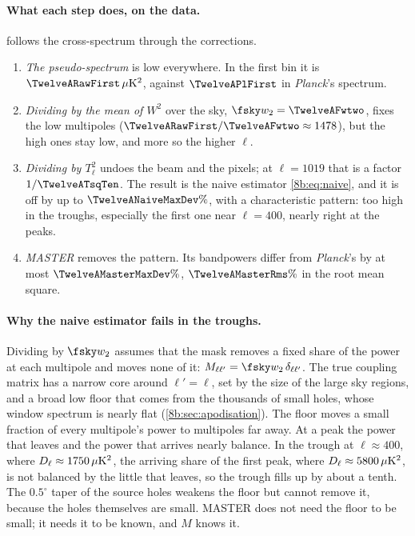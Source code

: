 \paragraph{What each step does, on the data.}  follows the cross-spectrum through the
corrections.
\begin{enumerate}[itemsep=2pt,leftmargin=1.5em]
  \item \emph{The pseudo-spectrum} is low everywhere. In the first bin it is $\TwelveARawFirst\,\mu{\rm K}^2$,
        against $\TwelveAPlFirst$ in \textit{Planck}'s spectrum.
  \item \emph{Dividing by the mean of $W^2$} over the sky, $\fsky w_2=\TwelveAFwtwo$, fixes the low multipoles
        ($\TwelveARawFirst/\TwelveAFwtwo\approx1478$), but the high ones stay low, and more so the higher $\ell$.
  \item \emph{Dividing by $T_\ell^2$} undoes the beam and the pixels; at $\ell=1019$ that is a factor
        $1/\TwelveATsqTen$. The result is the naive estimator \eqref{8b:eq:naive}, and it is off by up to
        $\TwelveANaiveMaxDev\%$, with a characteristic pattern: too high in the troughs, especially the first one
        near $\ell=400$, nearly right at the peaks.
  \item \emph{MASTER} removes the pattern. Its bandpowers differ from \textit{Planck}'s by at most
        $\TwelveAMasterMaxDev\%$, $\TwelveAMasterRms\%$ in the root mean square.
\end{enumerate}

\paragraph{Why the naive estimator fails in the troughs.} Dividing by $\fsky w_2$ assumes that the mask
removes a fixed share of the power at each multipole and moves none of it: $M_{\ell\ell'}=\fsky w_2\,\delta_{\ell\ell'}$.
The true coupling matrix has a narrow core around $\ell'=\ell$, set by the size of the large sky
regions, and a broad low floor that comes from the thousands of small holes, whose window spectrum is
nearly flat (\cref{8b:sec:apodisation}). The floor moves a small fraction of every multipole's power to
multipoles far away. At a peak the power that leaves and the power that arrives nearly balance. In the trough
at $\ell\approx400$, where $D_\ell\approx1750\,\mu{\rm K}^2$, the arriving share of the first peak, where
$D_\ell\approx5800\,\mu{\rm K}^2$, is not balanced by the little that leaves, so the trough fills up by about a tenth.
The $0.5^\circ$ taper of the source holes weakens the floor but cannot remove it, because the holes themselves
are small. MASTER does not need the floor to be small; it needs it to be known, and $M$ knows it.

